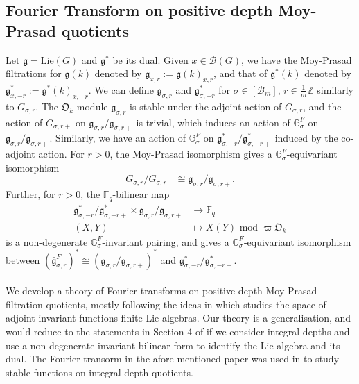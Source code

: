 \documentclass[11 pt]{article}
\numberwithin{equation}{subsection}
\theoremstyle{definition}
\theoremstyle{remark}
\theoremstyle{conjecture}
\newcommand{\fg}{\mathfrak g}
\newcommand{\bg}{\bar{\mathfrak g}}
\newcommand{\Z}{\mathbb Z}
\newcommand{\F}{\mathbb F}
\newcommand{\G}{\mathbb G}
\newcommand{\mf}{\mathfrak}
\newcommand{\B}{\mathcal{B}}
\begin{document}
\subsection{Fourier Transform on positive depth Moy-Prasad quotients}\label{subsection: Fouriertransform}
 Let $\fg=\text{Lie}(G)$ and $\fg^*$ be its dual. Given $x \in \B(G)$, we have the Moy-Prasad filtrations for $\fg(k)$ denoted by $\fg_{x,r}:=\fg(k)_{x,r}$, and that of $\fg^*(k)$ denoted by $\fg^*_{x,-r}:=\fg^*(k)_{x,-r}$. We can define $\fg_{\sigma,r}$ and $\fg^*_{\sigma,-r}$ for $\sigma \in [\B_m]$, $r \in \frac{1}{m}\Z$ similarly to $G_{\sigma,r}$. The $\mf O_k$-module $\fg_{\sigma,r}$ is stable under the adjoint action of $G_{\sigma,r}$, and the action of $G_{\sigma,r+}$ on $\fg_{\sigma,r}/\fg_{\sigma,r+}$ is trivial, which induces an action of $\G_{\sigma}^F$ on $\fg_{\sigma,r}/\fg_{\sigma,r+}$. Similarly, we have an action of $\G_{\sigma}^F$ on $\fg^*_{\sigma,-r}/\fg^*_{\sigma,-r+}$ induced by the co-adjoint action. For $r>0$, the Moy-Prasad isomorphism gives a $\G_\sigma^F$-equivariant isomorphism 
\begin{equation}
    G_{\sigma,r}/G_{\sigma,r+} \cong \fg_{\sigma,r}/\fg_{\sigma,r+}. 
\end{equation}
Further, for $r>0$, the $\F_q$-bilinear map 
\begin{align*}
    \fg^*_{\sigma,-r}/\fg^*_{\sigma,-r+} \times \fg_{\sigma,r}/\fg_{\sigma,r+} &\longrightarrow \F_q\\
    (X,Y)&\longmapsto X(Y) \text{ mod } \varpi \mf O_k
\end{align*}
is a non-degenerate $\G_\sigma^F$-invariant pairing, and gives a $\G_\sigma^F$-equivariant isomorphism between $(\bg_{\sigma,r}^F)^* \cong (\fg_{\sigma,r}/\fg_{\sigma,r+})^*$ and $\fg^*_{\sigma,-r}/\fg^*_{\sigma,-r+}$. \paragraph{}
We develop a theory of Fourier transforms on positive depth Moy-Prasad filtration quotients, mostly following the ideas in \cite{Le} which studies the space of adjoint-invariant functions finite Lie algebras. Our theory is a generalisation, and would reduce to the statements in Section 4 of \cite{Le} if we consider integral depths and use a non-degenerate invariant bilinear form to identify the Lie algebra and its dual. The Fourier transorm in the afore-mentioned paper was used in \cite{cb24} to study stable functions on integral depth quotients. \par
\end{document}
